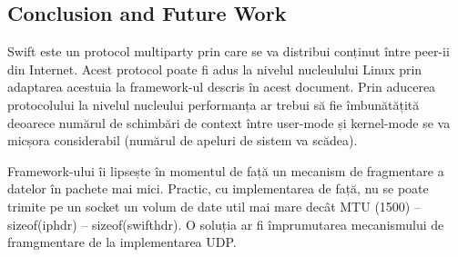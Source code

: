 \subsection{Conclusion and Future Work}

Swift este un protocol multiparty prin care se va distribui conținut între
peer-ii din Internet. Acest protocol poate fi adus la nivelul nucleulului
Linux prin adaptarea acestuia la framework-ul descris în acest document. Prin
aducerea protocolului la nivelul nucleului performanța ar trebui să fie
îmbunătățită deoarece numărul de schimbări de context între user-mode și
kernel-mode se va micșora considerabil (numărul de apeluri de sistem va
scădea).

Framework-ului îi lipsește în momentul de față un mecanism de fragmentare a
datelor în pachete mai mici. Practic, cu implementarea de față, nu se poate
trimite pe un socket un volum de date util mai mare decât MTU (1500) –
sizeof(iphdr) – sizeof(swifthdr). O soluția ar fi împrumutarea mecanismului de
framgmentare de la implementarea UDP.
